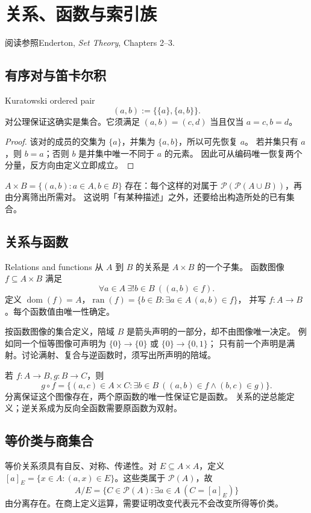 \chapter{关系、函数与索引族}
\begin{qlnote}{阅读参照}Enderton, \emph{Set Theory}, Chapters 2--3.\end{qlnote}

\section{有序对与笛卡尔积}
\begin{definition}{Kuratowski ordered pair}
\[
 (a,b):=\{\{a\},\{a,b\}\}.
\]
对公理保证这确实是集合。它须满足 \((a,b)=(c,d)\) 当且仅当 \(a=c,b=d\)。
\end{definition}
\begin{proof}
该对的成员的交集为 \(\{a\}\)，并集为 \(\{a,b\}\)，所以可先恢复 \(a\)。
若并集只有 \(a\)，则 \(b=a\)；否则 \(b\) 是并集中唯一不同于 \(a\) 的元素。
因此可从编码唯一恢复两个分量，反方向由定义立即成立。
\end{proof}

\(A\times B=\{(a,b):a\in A,b\in B\}\) 存在：每个这样的对属于
\(\mathcal P(\mathcal P(A\cup B))\)，再由分离筛出所需对。
这说明「有某种描述」之外，还要给出构造所处的已有集合。

\section{关系与函数}
\begin{definition}{Relations and functions}
从 \(A\) 到 \(B\) 的关系是 \(A\times B\) 的一个子集。
函数图像 \(f\subseteq A\times B\) 满足
\[
 \forall a\in A\ \exists!b\in B\ ((a,b)\in f).
\]
定义 \(\operatorname{dom}(f)=A\)，\(\operatorname{ran}(f)=\{b\in B:\exists a\in A\,(a,b)\in f\}\)，
并写 \(f:A\to B\)。每个函数值由唯一性确定。
\end{definition}
按函数图像的集合定义，陪域 \(B\) 是箭头声明的一部分，却不由图像唯一决定。
例如同一个恒等图像可声明为 \(\{0\}\to\{0\}\) 或 \(\{0\}\to\{0,1\}\)；
只有前一个声明是满射。讨论满射、复合与逆函数时，须写出所声明的陪域。

若 \(f:A\to B,g:B\to C\)，则
\[
 g\circ f=\{(a,c)\in A\times C:\exists b\in B\ ((a,b)\in f\land(b,c)\in g)\}.
\]
分离保证这个图像存在，两个原函数的唯一性保证它是函数。
关系的逆总能定义；逆关系成为反向全函数需要原函数为双射。

\section{等价类与商集合}
等价关系须具有自反、对称、传递性。对 \(E\subseteq A\times A\)，定义
\([a]_E=\{x\in A:(a,x)\in E\}\)。这些类属于 \(\mathcal P(A)\)，故
\[
 A/E=\{C\in\mathcal P(A):\exists a\in A\ (C=[a]_E)\}
\]
由分离存在。在商上定义运算，需要证明改变代表元不会改变所得等价类。

